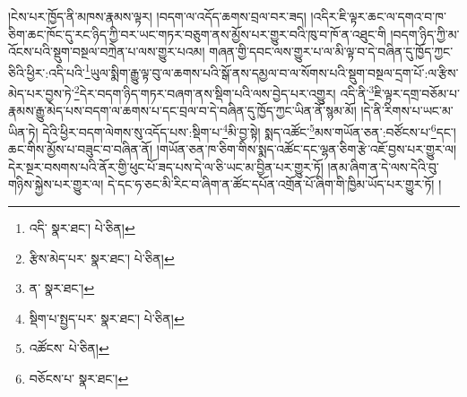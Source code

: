 །ངེས་པར་ཁྱོད་ནི་མཁས་རྣམས་ལྟར། །བདག་ལ་འདོད་ཆགས་བྲལ་བར་ཟད། །འདིར་ཇི་ལྟར་ཆང་ལ་དགའ་བ་ཁ་ཅིག་ཆང་ཁོང་དུ་རང་ཉིད་ཀྱི་བར་ཡང་གཏར་བཅུག་ནས་མྱོས་པར་གྱུར་བའི་ཁུ་བ་ཁོ་ན་འཐུང་གི །བདག་ཉིད་ཀྱི་མ་འོངས་པའི་སྡུག་བསྔལ་བཀྲེན་པ་ལས་གྱུར་པའམ། གཞན་གྱི་དབང་ལས་གྱུར་པ་ལ་མི་ལྟ་བ་དེ་བཞིན་དུ་ཁྱོད་ཀྱང་ཅིའི་ཕྱིར་:འདི་པའི་\footnote{འདི་  སྣར་ཐང་།  པེ་ཅིན། }ཡུལ་སྨིག་རྒྱུ་ལྟ་བུ་ལ་ཆགས་པའི་སྒོ་ནས་དམྱལ་བ་ལ་སོགས་པའི་སྡུག་བསྔལ་དྲག་པོ་:ལ་རྩིས་མེད་པར་བྱས་ཏེ་\footnote{རྩིས་མེད་པར་  སྣར་ཐང་།  པེ་ཅིན། }དེར་བདག་ཉིད་གཏར་བཞག་ནས་སྡིག་པའི་ལས་བྱེད་པར་འགྱུར། འདི་ནི་\footnote{ན་  སྣར་ཐང་། }ཇི་ལྟར་དགྲ་བཅོམ་པ་རྣམས་རྒྱུ་མེད་པས་བདག་ལ་ཆགས་པ་དང་བྲལ་བ་དེ་བཞིན་དུ་ཁྱོད་ཀྱང་ཡིན་ནོ་སྙམ་མོ། །དེ་ནི་རིགས་པ་ཡང་མ་ཡིན་ཏེ། དེའི་ཕྱིར་བདག་ལེགས་སུ་འདོད་པས་:སྡིག་པ་\footnote{སྡིག་པ་སྤྱད་པར་  སྣར་ཐང་།  པེ་ཅིན། }མི་བྱ་སྟེ། སྨད་འཚོང་\footnote{འཚོངས་  པེ་ཅིན། }མས་གཡོན་ཅན་:བཙོངས་པ་\footnote{བཅོངས་པ་  སྣར་ཐང་། }དང་། ཆང་གིས་མྱོས་པ་བཟུང་བ་བཞིན་ནོ། །གཡོན་ཅན་ཁ་ཅིག་གིས་སྨད་འཚོང་དང་ལྷན་ཅིག་རྩེ་འཇོ་བྱས་པར་གྱུར་ལ། དེར་སྔར་བསགས་པའི་ནོར་གྱི་ཕུང་པོ་ཟད་པས་དེ་ལ་ཅི་ཡང་མ་བྱིན་པར་གྱུར་ཏོ། །ནམ་ཞིག་ན་དེ་ལས་དེའི་བུ་གཉིས་སྐྱེས་པར་གྱུར་ལ། དེ་དང་ཧ་ཅང་མི་རིང་བ་ཞིག་ན་ཚོང་དཔོན་འགྲོན་པོ་ཞིག་གི་ཁྱིམ་ཡོད་པར་གྱུར་ཏོ། །
